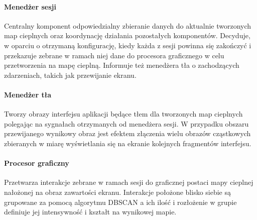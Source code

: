 \paragraph{Menedżer sesji} 
\label{par:rs_session_manager}
Centralny komponent odpowiedzialny zbieranie danych do aktualnie tworzonych map cieplnych oraz koordynację działania pozostałych komponentów. Decyduje, w oparciu o otrzymaną konfigurację, kiedy każda z sesji powinna się zakończyć i przekazuje zebrane w ramach niej dane do  procesora graficznego w celu przetworzenia na mapę cieplną. Informuje też menedżera tła o zachodzących zdarzeniach, takich jak przewijanie ekranu.

\paragraph{Menedżer tła} 
\label{par:rs_bg_manager}
Tworzy obrazy interfejsu aplikacji będące tłem dla tworzonych map cieplnych polegając na sygnałach otrzymanych od menedżera sesji. W przypadku obszaru przewijanego wynikowy obraz jest efektem złączenia wielu  obrazów cząstkowych zbieranych w miarę wyświetlania się na ekranie kolejnych fragmentów interfejsu.

\paragraph{Procesor graficzny} 
\label{par:rs_graphical_processor}
Przetwarza interakcje zebrane w ramach sesji do graficznej postaci mapy cieplnej nałożonej na obraz zawartości ekranu. Interakcje położone blisko siebie są grupowane za pomocą algorytmu DBSCAN \cite{DBSCAN_Wiki} a ich ilość i rozłożenie w grupie definiuje jej intensywność i kształt na wynikowej mapie.

